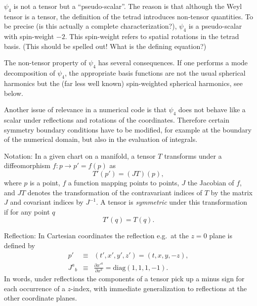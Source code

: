 \documentclass[12pt]{article}
\newcommand{\beq}{\begin{equation}}
\newcommand{\eeq}{\end{equation}}
\newcommand{\bea}{\begin{eqnarray}}
\newcommand{\eea}{\end{eqnarray}}
\newcommand{\mysec}[1]{\bigskip\noindent{\bf #1}\smallskip}
\begin{document}
$\psi_4$ is not a tensor but a ``pseudo-scalar''. The reason is that
although the Weyl tensor is a tensor, the definition of the tetrad
introduces non-tensor quantities. To be precise (is
this actually a complete characterization?), $\psi_4$ is a
pseudo-scalar with spin-weight $-2$. This spin-weight refers to
spatial rotations in the tetrad basis. (This should be spelled out!
What is the defining equation?)

The non-tensor property of $\psi_4$ has several consequences. If one
performs a mode decomposition of $\psi_4$, the appropriate basis
functions are not the usual spherical harmonics but the (far less well
known) spin-weighted spherical harmonics, see below.

Another issue of relevance in a numerical code is that $\psi_4$ does
not behave like a scalar under reflections and rotations of the
coordinates. Therefore certain symmetry boundary conditions have
to be modified, for example at the boundary of the numerical domain,
but also in the evaluation of integrals.



\mysec{Transformation of $\psi_4$ under reflections}

Notation: In a given chart on a manifold, a tensor $T$ transforms
under a diffeomorphism $f: p \rightarrow p' = f(p)$ as
\beq
        T'(p') = (J T)(p),
\eeq
where $p$ is a point, $f$ a function mapping points to points, $J$ 
the Jacobian of $f$, and $J T$ denotes the transformation of the
contravariant indices of $T$ by the matrix $J$ and covariant indices
by $J^{-1}$. A tensor is {\em symmetric} under this
transformation if for any point $q$
\beq
        T'(q) = T(q).
\eeq

Reflection: In Cartesian coordinates the reflection e.g.\ at the $z=0$ plane
is defined by
\bea
         p'&\equiv& (t',x',y',z') = (t,x,y,-z), \\
        {J^{a}}_b &\equiv& 
        \frac{\partial x'^{a}}{\partial x^b} = \mbox{diag}(1,1,1,-1).
\eea
In words, under reflections the components of a tensor pick up a minus
sign for each occurrence of a $z$-index, with immediate generalization
to reflections at the other coordinate planes.
\end{document}
